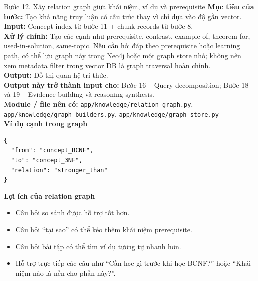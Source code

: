 \documentclass[12pt,a4paper]{article}
\newcommand{\stepgoal}[1]{\textbf{Mục tiêu của bước:} #1\\}
\newcommand{\stepinput}[1]{\textbf{Input:} #1\\}
\newcommand{\stepprocess}[1]{\textbf{Xử lý chính:} #1\\}
\newcommand{\stepoutput}[1]{\textbf{Output:} #1\\}
\newcommand{\stepnext}[1]{\textbf{Output này trở thành input cho:} #1\\}
\newcommand{\stepmodules}[1]{\textbf{Module / file nên có:} #1\\}
\begin{document}
\begin{stepbox}{Bước 12. Xây relation graph giữa khái niệm, ví dụ và prerequisite}
\stepgoal{Tạo khả năng truy luận có cấu trúc thay vì chỉ dựa vào độ gần vector.}
\stepinput{Concept index từ bước 11 + chunk records từ bước 8.}
\stepprocess{Tạo các cạnh như prerequisite, contrast, example-of, theorem-for, used-in-solution, same-topic. Nếu cần hỏi đáp theo prerequisite hoặc learning path, có thể lưu graph này trong Neo4j hoặc một graph store nhỏ; không nên xem metadata filter trong vector DB là graph traversal hoàn chỉnh.}
\stepoutput{Đồ thị quan hệ tri thức.}
\stepnext{Bước 16 -- Query decomposition; Bước 18 và 19 -- Evidence building và reasoning synthesis.}
\stepmodules{\texttt{app/knowledge/relation\_graph.py}, \texttt{app/knowledge/graph\_builders.py}, \texttt{app/knowledge/graph\_store.py}}

\textbf{Ví dụ cạnh trong graph}
\begin{lstlisting}
{
  "from": "concept_BCNF",
  "to": "concept_3NF",
  "relation": "stronger_than"
}
\end{lstlisting}

\textbf{Lợi ích của relation graph}
\begin{itemize}
    \item Câu hỏi so sánh được hỗ trợ tốt hơn.
    \item Câu hỏi ``tại sao'' có thể kéo thêm khái niệm prerequisite.
    \item Câu hỏi bài tập có thể tìm ví dụ tương tự nhanh hơn.
    \item Hỗ trợ trực tiếp các câu như ``Cần học gì trước khi học BCNF?'' hoặc ``Khái niệm nào là nền cho phần này?''.
\end{itemize}
\end{stepbox}
\end{document}
